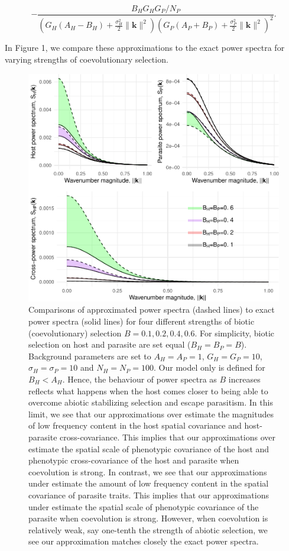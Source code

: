 \documentclass{article}
\begin{document}
\[-\frac{B_HG_HG_P/N_P}{\left(G_H(A_H-B_H)+\frac{\sigma_H^2}{2}\|\pmb k\|^2\right)\left(G_P(A_P+B_P)+\frac{\sigma_P^2}{2}\|\pmb k\|^2\right)^2}.\]

In Figure 1, we compare these approximations to the exact power spectra
for varying strengths of coevolutionary selection.

\begin{figure}
\centering
\includegraphics{Spatial-Scales-of-Local-Adaptation-in-Host-Parasite-Coevolution_files/figure-latex/unnamed-chunk-1-1.pdf}
\caption{Comparisons of approximated power spectra (dashed lines) to
exact power spectra (solid lines) for four different strengths of biotic
(coevolutionary) selection \(B=0.1,0.2,0.4,0.6\). For simplicity, biotic
selection on host and parasite are set equal (\(B_H=B_P=B\)). Background
parameters are set to \(A_H=A_P=1\), \(G_H=G_P=10\),
\(\sigma_H=\sigma_P=10\) and \(N_H=N_P=100\). Our model only is defined
for \(B_H<A_H\). Hence, the behaviour of power spectra as \(B\)
increases reflects what happens when the host comes closer to being able
to overcome abiotic stabilizing selection and escape parasitism. In this
limit, we see that our approximations over estimate the magnitudes of
low frequency content in the host spatial covariance and host-parasite
cross-covariance. This implies that our approximations over estimate the
spatial scale of phenotypic covariance of the host and phenotypic
cross-covariance of the host and parasite when coevolution is strong. In
contrast, we see that our approximations under estimate the amount of
low frequency content in the spatial covariance of parasite traits. This
implies that our approximations under estimate the spatial scale of
phenotypic covariance of the parasite when coevolution is strong.
However, when coevolution is relatively weak, say one-tenth the strength
of abiotic selection, we see our approximation matches closely the exact
power spectra.}
\end{figure}
\end{document}
